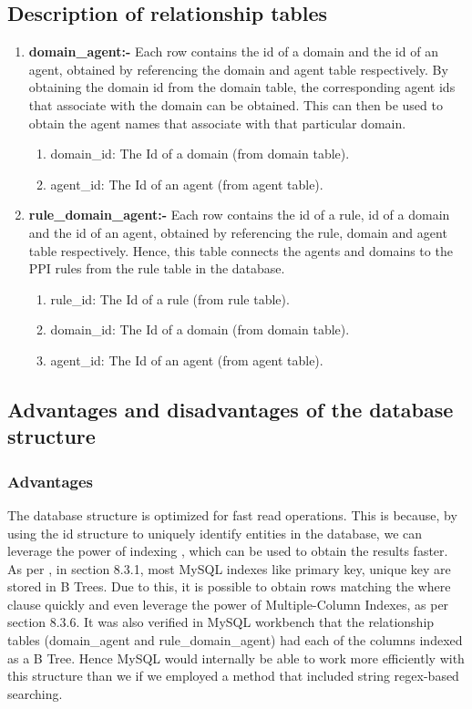 \documentclass[msc,deptreport,ai]{infthesis}      %
\begin{document}
 \subsection{Description of  relationship tables}
\begin{enumerate}
	\item \textbf{domain\_agent:-} Each row contains the id of a domain and the id of an agent, obtained by referencing the domain and agent table respectively. 
	By obtaining the domain id from the domain table, the corresponding agent ids that associate with the domain can be obtained. This can then be used to obtain the agent names that associate with that particular domain.
	\begin{enumerate}
		\item domain\_id: The Id of a domain (from domain table).
		\item agent\_id: The Id of an agent (from agent table).
	\end{enumerate}

	\item \textbf{rule\_domain\_agent:-} Each row contains the id of a rule, id of a domain and the id of an agent, obtained by referencing the rule, domain and agent table respectively. Hence, this table connects the agents and domains to the PPI rules from the rule table in the database.
	\begin{enumerate}
		\item rule\_id: The Id of a rule (from rule table).
		\item domain\_id: The Id of a domain (from domain table).
		\item agent\_id: The Id of an agent (from agent table).
	\end{enumerate}
\end{enumerate}
 \subsection{Advantages and  disadvantages of the database structure}
 \subsubsection{Advantages}
The database structure is optimized for fast read operations. This is because, by using the id structure to uniquely identify entities in the database, we can leverage the power of indexing \cite{indexing}, which can be used to obtain the results faster. As per \cite{indexing}, in section 8.3.1, most MySQL indexes like primary key, unique key are stored in B Trees. Due to this, it is possible to obtain rows matching the where clause quickly and even leverage the power of Multiple-Column Indexes, as per \cite{indexing} section 8.3.6. It was also verified in MySQL workbench that the relationship tables (domain\_agent and rule\_domain\_agent) had each of the columns indexed as a B Tree. Hence MySQL would internally be able to work more efficiently with this structure than we if we employed a method that included string regex-based searching.
\end{document}
